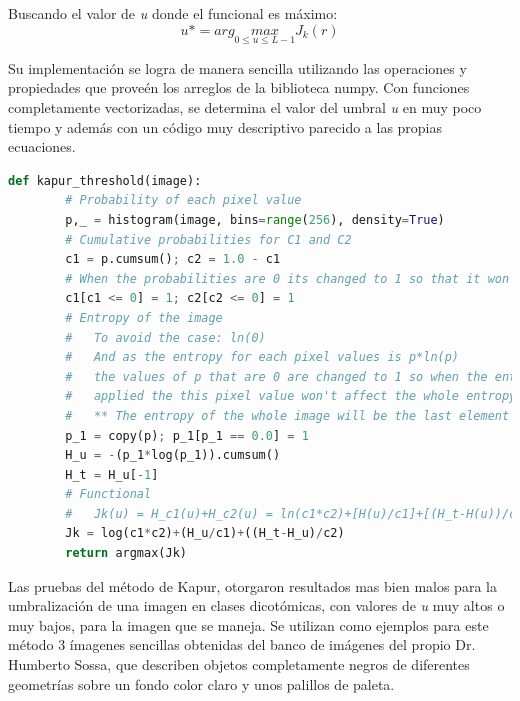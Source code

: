 	\hfill\break
	\justifying
	Buscando el valor de \textit{u} donde el funcional es máximo:
	{\Large \begin{equation*}
		u* = arg \underset{0 \leq u \leq L-1}{max} J_k(r)
	\end{equation*}}

	\hfill\break
	\justifying
	Su implementación se logra de manera sencilla utilizando las operaciones y propiedades que proveén los arreglos de la biblioteca numpy. Con funciones completamente vectorizadas, se determina el valor del umbral \textit{u} en muy poco tiempo y además con un código muy descriptivo parecido a las propias ecuaciones.
	
	\begin{lstlisting}[language=Python]
	def kapur_threshold(image):
		# Probability of each pixel value
		p,_ = histogram(image, bins=range(256), density=True)
		# Cumulative probabilities for C1 and C2
		c1 = p.cumsum(); c2 = 1.0 - c1
		# When the probabilities are 0 its changed to 1 so that it won't affect when used as divider
		c1[c1 <= 0] = 1; c2[c2 <= 0] = 1
		# Entropy of the image
		#   To avoid the case: ln(0)
		#   And as the entropy for each pixel values is p*ln(p)
		#   the values of p that are 0 are changed to 1 so when the entropy its
		#   applied the this pixel value won't affect the whole entropy
		#   ** The entropy of the whole image will be the last element of H_u
		p_1 = copy(p); p_1[p_1 == 0.0] = 1
		H_u = -(p_1*log(p_1)).cumsum()
		H_t = H_u[-1]
		# Functional
		#   Jk(u) = H_c1(u)+H_c2(u) = ln(c1*c2)+[H(u)/c1]+[(H_t-H(u))/c2]
		Jk = log(c1*c2)+(H_u/c1)+((H_t-H_u)/c2)
		return argmax(Jk)
	\end{lstlisting}

	\hfill\break
	\justifying
	Las pruebas del método de Kapur, otorgaron resultados mas bien malos para la umbralización de una imagen en clases dicotómicas, con valores de \textit{u} muy altos o muy bajos, para la imagen que se maneja. Se utilizan como ejemplos para este método 3 ímagenes sencillas obtenidas del banco de imágenes del propio Dr. Humberto Sossa, que describen objetos completamente negros de diferentes geometrías sobre un fondo color claro y unos palillos de paleta.
	
